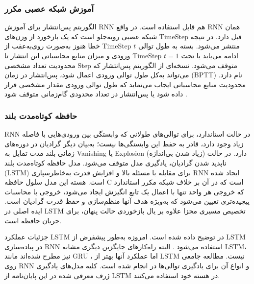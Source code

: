  
 
 \subsubsection{آموزش شبکه عصبی مکرر}
 الگوریتم پس‌انتشار برای آموزش \gls{RNN} هم قابل استفاده است. در واقع \gls{RNN} همان شبکه عصبی روبه‌جلو است که یک بازخورد از وزن‌‌های \gls{TimeStep} قبل دارد. در نتیجه خطا هنوز به‌صورت روی‌به‌عقب از \gls{TimeStep}  $ t $ منتشر می‌شود. بسته به طول توالی ورودی و میزان منابع محاسباتی این انتشار تا \gls{TimeStep}  $ t=1 $ ادامه می‌یابد یا تحت محدودیت تعداد مشخصی \gls{Step} متوقف می‌شود. نسخه‌ای از الگوریتم پس‌انتشار که می‌تواند به‌کل طول توالی ورودی اعمال شود، پس‌انتشار در زمان (\gls{BPTT}) نام دارد. محدودیت منابع محاسباتی ایجاب می‌نماید که طول توالی ورودی مقدار مشخصی قرار داده شود یا پس‌انتشار در تعداد محدودی گام‌زمانی متوقف شود \cite{Goodfellow-et-al-2016}.  
 
 
 \subsubsection{حافظه کوتاه‌مدت بلند}
 \gls{RNN} در حالت استاندارد، برای توالی‌‌های طولانی که وابستگی بین ورودی‌هایی با فاصله زیاد وجود دارد، قادر به حفظ این وابستگی‌ها نیست؛ به‌بیان دیگر گرادیان در دوره‌‌های زمانی بلند مدت تمایل به \gls{Vanishing} یا \gls{Explosion} (زیاد شدن بی‌اندازه) دارد. در حالت ناپدید شدن گرادیان، یادگیری مدل متوقف می‌شود. مدل حافظه کوتاه‌مدت بلند (\gls{LSTM})  برای مقابله با مسئله بالا و افزایش قدرت به‌خاطر‌سپاری   \gls{RNN} ایجاد شده است. هسته این مدل سلول حافظه C است که در آن بر خلاف شبکه مکرر استاندارد که خروجی هر واحد تنها با اعمال یک تابع انگیزش ایجاد می‌شود، خروجی با محاسبات پیچیده‌تری تعیین می‌شود که به‌ویژه هدف آنها منظم‌سازی و حفظ قدرت گرادیان است. ایده اصلی در \gls{LSTM} تخصیص مسیری مجزا علاوه بر یال بازخوردی حالت پنهان، برای جریان حافظه است.
 
 جزئیات عملکرد \gls{LSTM} در \cite{Goodfellow-et-al-2016} توضیح داده شده است. امروزه به‌طور پیشفرض از \gls{LSTM} در پیاده‌سازی \gls{RNN} استفاده می‌شود \cite{DBLP:journals/corr/GreffSKSS15}. البته راه‌کارهای جایگزین دیگری مشابه \gls{LSTM}، نیز مطرح شده‌اند مانند \gls{GRU} \cite{DBLP:journals/corr/ChoMGBSB14}، اما عملکرد آنها بهتر از  \gls{LSTM} نیست. مطالعه جامعی روی \gls{RNN} و انواع آن برای یادگیری توالی‌ها در \cite{DBLP:journals/corr/Lipton15} انجام شده است. کلیه مدل‌های یادگیری ژرف معرفی شده در این پایان‌نامه از \gls{LSTM} در هسته خود استفاده می‌کنند. 
 
 
 
 
 
